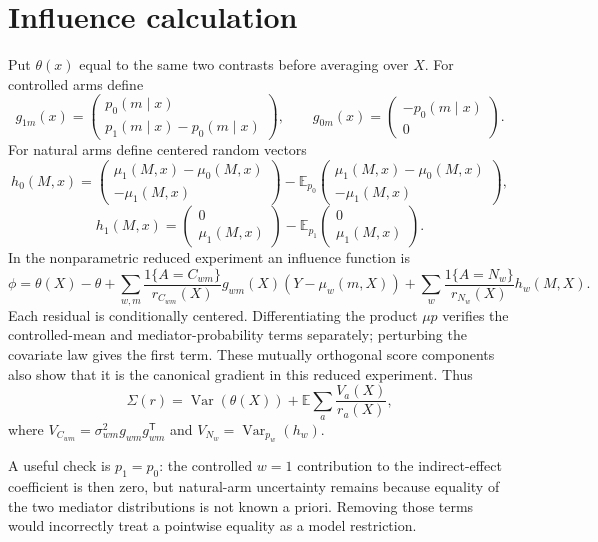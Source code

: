 \documentclass[11pt]{article}
\newcommand{\E}{\mathbb E}
\begin{document}
\section*{Influence calculation}
Put $\theta(x)$ equal to the same two contrasts before averaging over $X$. For controlled arms define
\[
 g_{1m}(x)=\begin{pmatrix}p_0(m\mid x)\\p_1(m\mid x)-p_0(m\mid x)\end{pmatrix},
 \qquad g_{0m}(x)=\begin{pmatrix}-p_0(m\mid x)\\0\end{pmatrix}.
\]
For natural arms define centered random vectors
\[
 h_0(M,x)=\begin{pmatrix}\mu_1(M,x)-\mu_0(M,x)\\-\mu_1(M,x)\end{pmatrix}
 -\E_{p_0}\begin{pmatrix}\mu_1(M,x)-\mu_0(M,x)\\-\mu_1(M,x)\end{pmatrix},
\]
\[
 h_1(M,x)=\begin{pmatrix}0\\\mu_1(M,x)\end{pmatrix}
 -\E_{p_1}\begin{pmatrix}0\\\mu_1(M,x)\end{pmatrix}.
\]
In the nonparametric reduced experiment an influence function is
\[
 \phi=\theta(X)-\theta+
 \sum_{w,m}\frac{1\{A=C_{wm}\}}{r_{C_{wm}}(X)}g_{wm}(X)(Y-\mu_w(m,X))
 +\sum_w\frac{1\{A=N_w\}}{r_{N_w}(X)}h_w(M,X).
\]
Each residual is conditionally centered. Differentiating the product $\mu p$ verifies the controlled-mean and mediator-probability terms separately; perturbing the covariate law gives the first term. These mutually orthogonal score components also show that it is the canonical gradient in this reduced experiment. Thus
\[
 \Sigma(r)=\operatorname{Var}(\theta(X))+
 \E\sum_a\frac{V_a(X)}{r_a(X)}, \tag{1}
\]
where $V_{C_{wm}}=\sigma^2_{wm}g_{wm}g_{wm}^{\mathsf T}$ and
$V_{N_w}=\operatorname{Var}_{p_w}(h_w)$.

A useful check is $p_1=p_0$: the controlled $w=1$ contribution to the indirect-effect coefficient is then zero, but natural-arm uncertainty remains because equality of the two mediator distributions is not known a priori. Removing those terms would incorrectly treat a pointwise equality as a model restriction.
\end{document}
